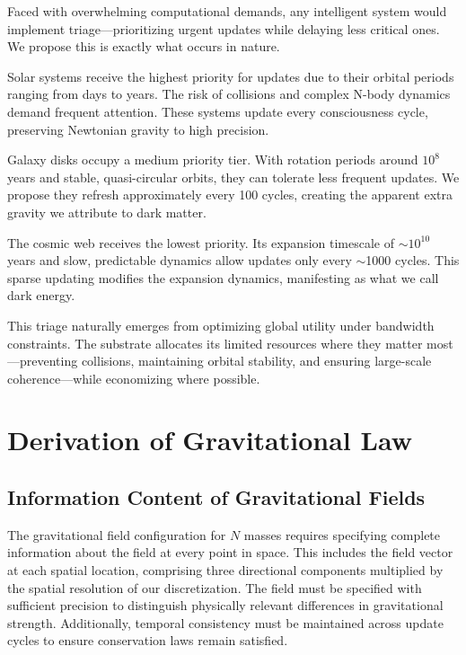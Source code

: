 \documentclass[twocolumn,prd,amsmath,amssymb,aps,superscriptaddress,nofootinbib]{revtex4-2}
\begin{document}
Faced with overwhelming computational demands, any intelligent system would implement triage---prioritizing urgent updates while delaying less critical ones. We propose this is exactly what occurs in nature.

Solar systems receive the highest priority for updates due to their orbital periods ranging from days to years. The risk of collisions and complex N-body dynamics demand frequent attention. These systems update every consciousness cycle, preserving Newtonian gravity to high precision.

Galaxy disks occupy a medium priority tier. With rotation periods around $10^8$ years and stable, quasi-circular orbits, they can tolerate less frequent updates. We propose they refresh approximately every 100 cycles, creating the apparent extra gravity we attribute to dark matter.

The cosmic web receives the lowest priority. Its expansion timescale of $\sim 10^{10}$ years and slow, predictable dynamics allow updates only every $\sim$1000 cycles. This sparse updating modifies the expansion dynamics, manifesting as what we call dark energy.

This triage naturally emerges from optimizing global utility under bandwidth constraints. The substrate allocates its limited resources where they matter most---preventing collisions, maintaining orbital stability, and ensuring large-scale coherence---while economizing where possible.

\section{Derivation of Gravitational Law}
\label{sec:derivation}

\subsection{Information Content of Gravitational Fields}

The gravitational field configuration for $N$ masses requires specifying complete information about the field at every point in space. This includes the field vector at each spatial location, comprising three directional components multiplied by the spatial resolution of our discretization. The field must be specified with sufficient precision to distinguish physically relevant differences in gravitational strength. Additionally, temporal consistency must be maintained across update cycles to ensure conservation laws remain satisfied.
\end{document}
